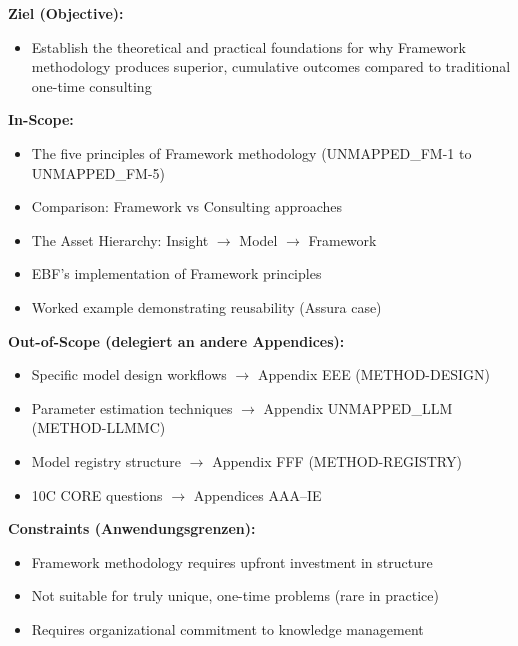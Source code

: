 \begin{tcolorbox}[
    colback=orange!5!white,
    colframe=orange!75!black,
    title={\textbf{Appendix Scope: Ziel / In-Scope / Out-of-Scope / Constraints}},
    fonttitle=\bfseries
]

\textbf{Ziel (Objective):}
\begin{itemize}[nosep]
    \item Establish the theoretical and practical foundations for why Framework methodology produces superior, cumulative outcomes compared to traditional one-time consulting
\end{itemize}

\textbf{In-Scope:}
\begin{itemize}[nosep]
    \item The five principles of Framework methodology (UNMAPPED_FM-1 to UNMAPPED_FM-5)
    \item Comparison: Framework vs Consulting approaches
    \item The Asset Hierarchy: Insight $\to$ Model $\to$ Framework
    \item EBF's implementation of Framework principles
    \item Worked example demonstrating reusability (Assura case)
\end{itemize}

\textbf{Out-of-Scope (delegiert an andere Appendices):}
\begin{itemize}[nosep]
    \item Specific model design workflows $\rightarrow$ Appendix EEE (METHOD-DESIGN)
    \item Parameter estimation techniques $\rightarrow$ Appendix UNMAPPED_LLM (METHOD-LLMMC)
    \item Model registry structure $\rightarrow$ Appendix FFF (METHOD-REGISTRY)
    \item 10C CORE questions $\rightarrow$ Appendices AAA--IE
\end{itemize}

\textbf{Constraints (Anwendungsgrenzen):}
\begin{itemize}[nosep]
    \item Framework methodology requires upfront investment in structure
    \item Not suitable for truly unique, one-time problems (rare in practice)
    \item Requires organizational commitment to knowledge management
\end{itemize}


\end{tcolorbox}
